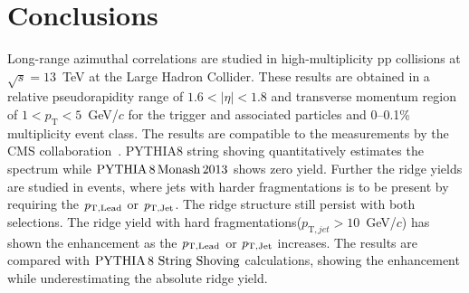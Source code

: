 
\section{Conclusions}
\label{sec:summary}
Long-range azimuthal correlations are studied in high-multiplicity pp collisions at $\sqrt{s} = 13$~TeV at the Large Hadron Collider. These results are obtained in a relative pseudorapidity range of $1.6 < |\eta| < 1.8$ and transverse momentum region of $1 < p_{\mathrm T} < 5$~GeV/$c$ for the trigger and associated particles and 0--0.1\% multiplicity event class. 
The results are compatible to the measurements by the CMS collaboration~\cite{Khachatryan:2015lva}.
PYTHIA8 string shoving quantitatively estimates the spectrum while $\mathrm{PYTHIA}\,8\,\mathrm{Monash}\,2013$ shows zero yield. Further the ridge yields are studied in events, where jets with harder fragmentations is to be present by requiring the $\it{p}_{\rm{T,Lead}}$ or $\it{p}_{\rm{T,Jet}}$. The ridge structure still persist with both selections. The ridge yield with hard fragmentations($p_{\mathrm T, jet} > 10$~GeV/$c$) has shown the enhancement as the $\it{p}_{\rm{T,Lead}}$ or $\it{p}_{\rm{T,Jet}}$ increases. The results are compared with $\mathrm{PYTHIA}\,8~\mathrm{String}~\mathrm{Shoving}$ calculations, showing the enhancement while underestimating the absolute ridge yield.